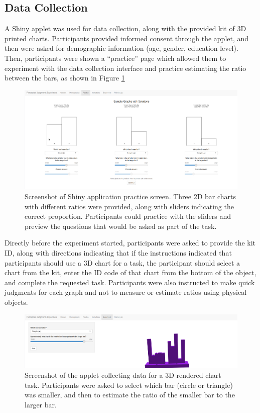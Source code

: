 \documentclass[letterpaper,inpress,dvipsnames]{jdsart}
\begin{document}
\hypertarget{data-collection}{%
\subsection{Data Collection}\label{data-collection}}

A Shiny applet was used for data collection, along with the provided kit of 3D printed charts.
Participants provided informed consent through the applet, and then were asked for demographic information (age, gender, education level).
Then, participants were shown a ``practice'' page which allowed them to experiment with the data collection interface and practice estimating the ratio between the bars, as shown in Figure \ref{fig:practice}

\begin{figure}
\includegraphics[width=6.4in]{03-Practice-2} \caption{Screenshot of Shiny application practice screen. Three 2D bar charts with different ratios were provided, along with sliders indicating the correct proportion. Participants could practice with the sliders and preview the questions that would be asked as part of the task.}\label{fig:practice}
\end{figure}

Directly before the experiment started, participants were asked to provide the kit ID, along with directions indicating that if the instructions indicated that participants should use a 3D chart for a task, the participant should select a chart from the kit, enter the ID code of that chart from the bottom of the object, and complete the requested task.
Participants were also instructed to make quick judgments for each graph and not to measure or estimate ratios using physical objects.

\begin{figure}
\includegraphics[width=6.4in]{05-Experiment-05-filled-in} \caption{Screenshot of the applet collecting data for a 3D rendered chart task. Participants were asked to select which bar (circle or triangle) was smaller, and then to estimate the ratio of the smaller bar to the larger bar.}\label{fig:experiment3dRender}
\end{figure}
\end{document}
